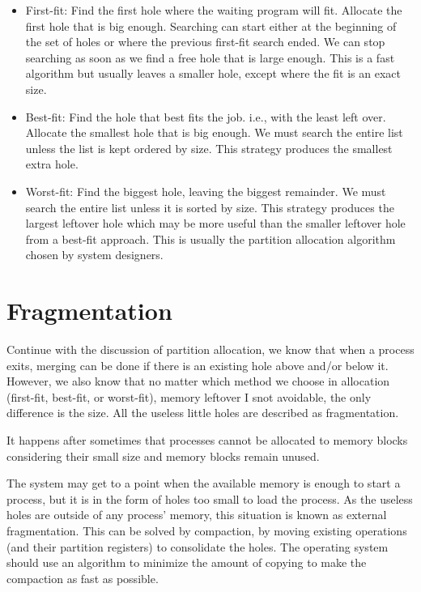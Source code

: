 \documentclass[doc,natbib,12pt]{apa6}
\begin{document}
	\begin{itemize}
		\item First-fit: Find the first hole where the waiting program will fit. Allocate the first hole that is big enough. Searching can start either at the beginning of the set of holes or where the previous first-fit search ended. We can stop searching as soon as we find a free hole that is large enough. This is a fast algorithm but usually leaves a smaller hole, except where the fit is an exact size.
		\item Best-fit: Find the hole that best fits the job. i.e., with the least left over. Allocate the smallest hole that is big enough. We must search the entire list unless the list is kept ordered by size. This strategy produces the smallest extra hole.
		\item Worst-fit: Find the biggest hole, leaving the biggest remainder. We must search the entire list unless it is sorted by size. This strategy produces the largest leftover hole which may be more useful than the smaller leftover hole from a best-fit approach. This is usually the partition allocation algorithm chosen by system designers.
	\end{itemize}
	
	
	\newpage
	\section{Fragmentation} \label{chp:fragmentation}
	Continue with the discussion of partition allocation, we know that when a process exits, merging can be done if there is an existing hole above and/or below it. However, we also know that no matter which method we choose in allocation (first-fit, best-fit, or worst-fit), memory leftover I snot avoidable, the only difference is the size. All the useless little holes are described as fragmentation.
	
	It happens after sometimes that processes cannot be
	allocated to memory blocks considering their small size and memory blocks
	remain unused. 
	
	
	The system may get to a point when the available memory is enough to start a process, but it is in the form of holes too small to load the process. As the useless holes are outside of any process' memory, this situation is known as external fragmentation. This can be solved by compaction, by moving existing operations (and their partition registers) to consolidate the holes. The operating system should use an algorithm to minimize the amount of copying to make the compaction as fast as possible.
	
\end{document}
